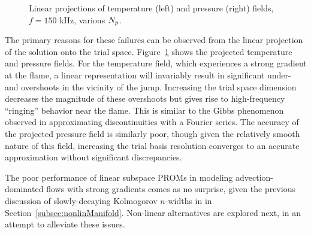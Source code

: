 \begin{figure}
\begin{minipage}{0.49\linewidth}
    \end{minipage}
    \caption{\label{fig:flameLinearProj}Linear projections of temperature (left) and pressure (right) fields, $f = 150$ kHz, various $N_p$.}
\end{figure}

The primary reasons for these failures can be observed from the linear projection of the solution onto the trial space. Figure~\ref{fig:flameLinearProj} shows the projected temperature and pressure fields. For the temperature field, which experiences a strong gradient at the flame, a linear representation will invariably result in significant under- and overshoots in the vicinity of the jump. Increasing the trial space dimension decreases the magnitude of these overshoots but gives rise to high-frequency ``ringing'' behavior near the flame. This is similar to the Gibbs phenomenon observed in approximating discontinuities with a Fourier series. The accuracy of the projected pressure field is similarly poor, though given the relatively smooth nature of this field, increasing the trial basis resolution converges to an accurate approximation without significant discrepancies.

The poor performance of linear subspace PROMs in modeling advection-dominated flows with strong gradients comes as no surprise, given the previous discussion of slowly-decaying Kolmogorov $n$-widths in in Section~\ref{subsec:nonlinManifold}. Non-linear alternatives are explored next, in an attempt to alleviate these issues.